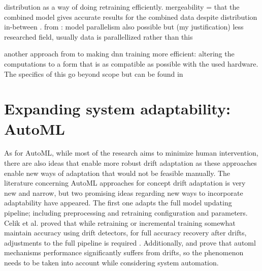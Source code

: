 distribution as a way of doing retraining efficiently. mergeability =  that the combined model gives accurate results for the combined data despite distribution in-between \cite{bifetMachineLearningData2017}. from \cite{ben-nunDemystifyingParallelDistributed2019}: model parallelism also possible but (my justification) less researched field, usually data is parallellized rather than this

another approach from \cite{ben-nunDemystifyingParallelDistributed2019} to making dnn training more efficient: altering the computations to a form that is as compatible as possible with the used hardware. The specifics of this go beyond scope but can be found in \cite{ben-nunDemystifyingParallelDistributed2019}


\section{Expanding system adaptability: AutoML}

As for AutoML, while most of the research aims to minimize human intervention, there are also ideas that enable more robust drift adaptation as these approaches enable new ways of adaptation that would not be feasible manually. The literature concerning AutoML approaches for concept drift adaptation is very new and narrow, but two promising ideas regarding new ways to incorporate adaptability have appeared. The first one adapts the full model updating pipeline; including preprocessing and retraining configuration and parameters. Celik et al. proved that while retraining or incremental training somewhat maintain accuracy using drift detectors, for full accuracy recovery after drifts, adjustments to the full pipeline is required \cite{celikAdaptationStrategiesAutomated2021}. Additionally, \cite{celikAdaptationStrategiesAutomated2021} and \cite{madridAutoMLPresenceDrift2019} prove that automl mechanisms performance significantly suffers from drifts, so the phenomenon needs to be taken into account while considering system automation. 


